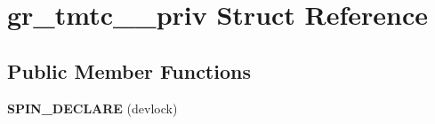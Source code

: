 \hypertarget{structgr__tmtc__1553__priv}{}\section{gr\+\_\+tmtc\+\_\+\_\+priv Struct Reference}
\label{structgr__tmtc__1553__priv}
\subsection*{Public Member Functions}
\begin{DoxyCompactItemize}
\item 
\mbox{\label{structgr__tmtc__1553__priv_ac15936d5a58b78c70c811bd77351ee07}} 
{\bfseries S\+P\+I\+N\+\_\+\+D\+E\+C\+L\+A\+RE} (devlock)
\end{DoxyCompactItemize}
